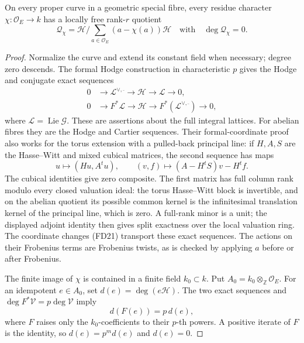 \begin{srlemma}
\label{lem:sr-flat-fibre-character-degree-zero}
On every proper curve in a geometric special fibre, every
residue character \(\chi:\mathcal O_E\to k\) has a locally
free rank-\(r\) quotient
\[
 \mathcal Q_\chi=\mathcal H/
          \sum_{a\in\mathcal O_E}(a-\chi(a))\mathcal H
                       \quad\text{with}\quad\deg\mathcal Q_\chi=0 .
 \tag{FD23}
\]
\end{srlemma}
\begin{proof}
Normalize the curve and extend its constant field when necessary;
degree zero descends.
The formal Hodge construction in characteristic \(p\) gives
the Hodge and conjugate exact sequences
\[
 \begin{split}
 0&\to\mathcal L^{\vee,\bar{\ }}\to\mathcal H\to\mathcal L\to0,\\
 0&\to F^*\mathcal L\to\mathcal H
                         \to F^*(\mathcal L^{\vee,\bar{\ }})\to0,
 \end{split}
 \tag{FD24}
\]
where \(\mathcal L=\operatorname{Lie}\mathcal G\).
These are assertions about the full integral lattices.
For abelian fibres they are the Hodge and Cartier sequences.
Their formal-coordinate proof also works for the torus
extension with a pulled-back principal line:
if \(H,A,S\) are the Hasse--Witt and mixed cubical matrices,
the second sequence has maps
\[
              u\mapsto(Hu,A^tu),\qquad
              (v,f)\mapsto(A-H^tS)v-H^tf.
\]
The cubical identities give zero composite.
The first matrix has full column rank modulo every closed
valuation ideal: the torus Hasse--Witt block is invertible,
and on the abelian quotient its possible common kernel is
the infinitesimal translation kernel of the principal line,
which is zero.
A full-rank minor is a unit; the displayed adjoint identity
then gives split exactness over the local valuation ring.
The coordinate changes (FD21) transport these exact sequences.
The actions on their Frobenius terms are Frobenius twists,
as is checked by applying \(a\) before or after Frobenius.

The finite image of \(\chi\) is contained in a finite field
\(k_0\subset k\).  Put \(A_0=k_0\otimes_{\mathbb Z}\mathcal O_E\).
For an idempotent \(e\in A_0\), set \(d(e)=\deg(e\mathcal H)\).
The two exact sequences and
\(\deg F^*\mathcal V=p\deg\mathcal V\) imply
\[
                              d(F(e))=p\,d(e),
 \tag{FD25}
\]
where \(F\) raises only the \(k_0\)-coefficients to their
\(p\)-th powers.  A positive iterate of \(F\) is the identity,
so \(d(e)=p^m d(e)\) and \(d(e)=0\).


\end{proof}
